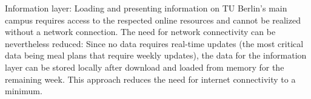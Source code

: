 Information layer: Loading and presenting information on TU Berlin's main campus requires access to the respected online resources and cannot be realized without a network connection. The need for network connectivity can be nevertheless reduced: Since no data requires real-time updates (the most critical data being meal plans that require weekly updates), the data for the information layer can be stored locally after download and loaded from memory for the remaining week. This approach reduces the need for internet connectivity to a minimum.


